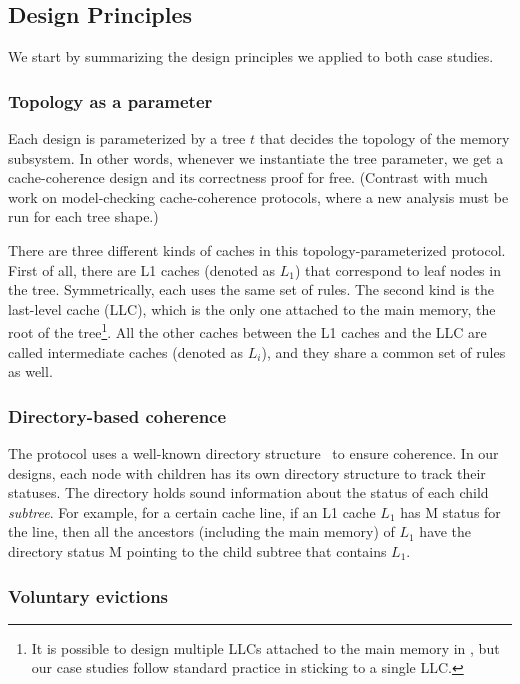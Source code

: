 \documentclass[sigplan,10pt,review,anonymous,screen]{acmart}\settopmatter{printfolios=true,printccs=false,printacmref=false}
\begin{document}
\subsection{Design Principles}
We start by summarizing the design principles we applied to both case studies.

\subsubsection{Topology as a parameter}
\label{sec-topo-param}
Each design is parameterized by a tree $t$ that decides the topology of the memory subsystem.
In other words, whenever we instantiate the tree parameter, we get a cache-coherence design and its correctness proof for free.
(Contrast with much work on model-checking cache-coherence protocols, where a new analysis must be run for each tree shape.)

There are three different kinds of caches in this topology-parameterized protocol.
First of all, there are L1 caches (denoted as $L_1$) that correspond to leaf nodes in the tree.
Symmetrically, each uses the same set of rules.
The second kind is the last-level cache (LLC), which is the only one attached to the main memory, the root of the tree\footnote{It is possible to design multiple LLCs attached to the main memory in \hemiola{}, but our case studies follow standard practice in sticking to a single LLC.}.
All the other caches between the L1 caches and the LLC are called intermediate caches (denoted as $L_i$), and they share a common set of rules as well.

\subsubsection{Directory-based coherence}

The protocol uses a well-known directory structure~\cite{Tang:1976} to ensure coherence.
In our designs, each node with children has its own directory structure to track their statuses.
The directory holds sound information about the status of each child \emph{subtree}.
For example, for a certain cache line, if an L1 cache $L_1$ has M status for the line, then all the ancestors (including the main memory) of $L_1$ have the directory status M pointing to the child subtree that contains $L_1$.

\subsubsection{Voluntary evictions}
\end{document}
